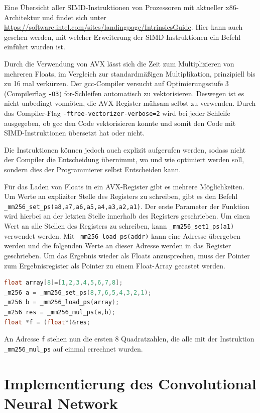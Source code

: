 \documentclass[../main.tex]{subfiles}
\begin{document}
Eine Übersicht aller SIMD-Instruktionen von Prozessoren mit aktueller x86-Architektur und findet sich unter \url{https://software.intel.com/sites/landingpage/IntrinsicsGuide}. Hier kann auch gesehen werden, mit welcher Erweiterung der SIMD Instruktionen ein Befehl einführt wurden ist.

Durch die Verwendung von AVX lässt sich die Zeit zum Multiplizieren von mehreren Floats, im Vergleich zur standardmäßigen Multiplikation, prinzipiell bis zu 16 mal verkürzen. Der gcc-Compiler versucht auf Optimierungsstufe 3 (Compilerflag \texttt{-O3}) for-Schleifen automatisch zu vektorisieren. Deswegen ist es nicht unbedingt vonnöten, die AVX-Register mühsam selbst zu verwenden. Durch das Compiler-Flag \texttt{-ftree-vectorizer-verbose=2} wird bei jeder Schleife ausgegeben, ob gcc den Code vektorisieren konnte und somit den Code mit SIMD-Instruktionen übersetzt hat oder nicht.

Die Instruktionen können jedoch auch explizit aufgerufen werden, sodass nicht der Compiler die Entscheidung übernimmt, wo und wie optimiert werden soll, sondern dies der Programmierer selbst Entscheiden kann. 

Für das Laden von Floats in ein AVX-Register gibt es mehrere Möglichkeiten. Um Werte an expliziter Stelle des Registers zu schreiben, gibt es den Befehl \texttt{\_mm256\_set\_ps(a8,a7,a6,a5,a4,a3,a2,a1)}. Der erste Parameter der Funktion wird hierbei an der letzten Stelle innerhalb des Registers geschrieben. Um einen Wert an alle Stellen des Registers zu schreiben, kann \texttt{\_mm256\_set1\_ps(a1)} verwendet werden. Mit \texttt{\_mm256\_load\_ps(addr)} kann eine Adresse übergeben werden und die folgenden Werte an dieser Adresse werden in das Register geschrieben. 
Um das Ergebnis wieder als Floats anzusprechen, muss der Pointer zum Ergebnisregister als Pointer zu einem Float-Array gecastet werden.

\begin{lstlisting}[language=c++, caption=Multiplikation mit AVX, captionpos=b, label=listing:avx_multiplikation, frame=single, linewidth=\textwidth, breaklines=true]
float array[8]=[1,2,3,4,5,6,7,8];
_m256 a = _mm256_set_ps(8,7,6,5,4,3,2,1);
_m256 b = _mm256_load_ps(array);
_m256 res = _mm256_mul_ps(a,b);
float *f = (float*)&res;
\end{lstlisting}
An Adresse \texttt{f} stehen nun die ersten 8 Quadratzahlen, die alle mit der Instruktion \texttt{\_mm256\_mul\_ps} auf einmal errechnet wurden.


\section{Implementierung des Convolutional Neural Network}
\end{document}

